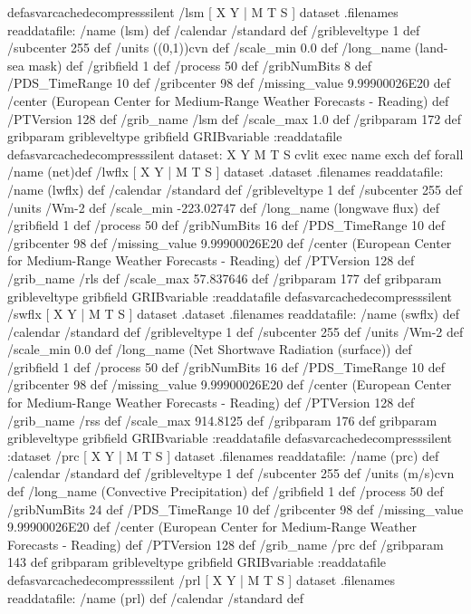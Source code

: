 \begin{ingrid}
{{}defasvarcachedecompresssilent
 /lsm{
[ X Y | M T S ] dataset .filenames readdatafile:
/name (lsm) def
 /calendar /standard def
 /gribleveltype 1 def
 /subcenter 255 def
 /units ((0,1))cvn def
 /scale_min 0.0 def
 /long_name (land-sea mask) def
 /gribfield 1 def
 /process 50 def
 /gribNumBits 8 def
 /PDS_TimeRange 10 def
 /gribcenter 98 def
 /missing_value 9.99900026E20 def
 /center (European Center for Medium-Range Weather Forecasts - Reading) def
 /PTVersion 128 def
 /grib_name /lsm def
 /scale_max 1.0 def
 /gribparam 172 def
 gribparam gribleveltype gribfield GRIBvariable
 :readdatafile
}defasvarcachedecompresssilent
dataset:
{ X Y M T S} cvlit { exec name exch def} forall
/name (net)def
 /lwflx{
[ X Y | M T S ] dataset .dataset .filenames readdatafile:
/name (lwflx) def
 /calendar /standard def
 /gribleveltype 1 def
 /subcenter 255 def
 /units /Wm-2 def
 /scale_min -223.02747 def
 /long_name (longwave flux) def
 /gribfield 1 def
 /process 50 def
 /gribNumBits 16 def
 /PDS_TimeRange 10 def
 /gribcenter 98 def
 /missing_value 9.99900026E20 def
 /center (European Center for Medium-Range Weather Forecasts - Reading) def
 /PTVersion 128 def
 /grib_name /rls def
 /scale_max 57.837646 def
 /gribparam 177 def
 gribparam gribleveltype gribfield GRIBvariable
 :readdatafile
}defasvarcachedecompresssilent
 /swflx{
[ X Y | M T S ] dataset .dataset .filenames readdatafile:
/name (swflx) def
 /calendar /standard def
 /gribleveltype 1 def
 /subcenter 255 def
 /units /Wm-2 def
 /scale_min 0.0 def
 /long_name (Net Shortwave Radiation (surface)) def
 /gribfield 1 def
 /process 50 def
 /gribNumBits 16 def
 /PDS_TimeRange 10 def
 /gribcenter 98 def
 /missing_value 9.99900026E20 def
 /center (European Center for Medium-Range Weather Forecasts - Reading) def
 /PTVersion 128 def
 /grib_name /rss def
 /scale_max 914.8125 def
 /gribparam 176 def
 gribparam gribleveltype gribfield GRIBvariable
 :readdatafile
}defasvarcachedecompresssilent
:dataset
 /prc{
[ X Y | M T S ] dataset .filenames readdatafile:
/name (prc) def
 /calendar /standard def
 /gribleveltype 1 def
 /subcenter 255 def
 /units (m/s)cvn def
 /long_name (Convective Precipitation) def
 /gribfield 1 def
 /process 50 def
 /gribNumBits 24 def
 /PDS_TimeRange 10 def
 /gribcenter 98 def
 /missing_value 9.99900026E20 def
 /center (European Center for Medium-Range Weather Forecasts - Reading) def
 /PTVersion 128 def
 /grib_name /prc def
 /gribparam 143 def
 gribparam gribleveltype gribfield GRIBvariable
 :readdatafile
}defasvarcachedecompresssilent
 /prl{
[ X Y | M T S ] dataset .filenames readdatafile:
/name (prl) def
 /calendar /standard def
}}
\end{ingrid}
